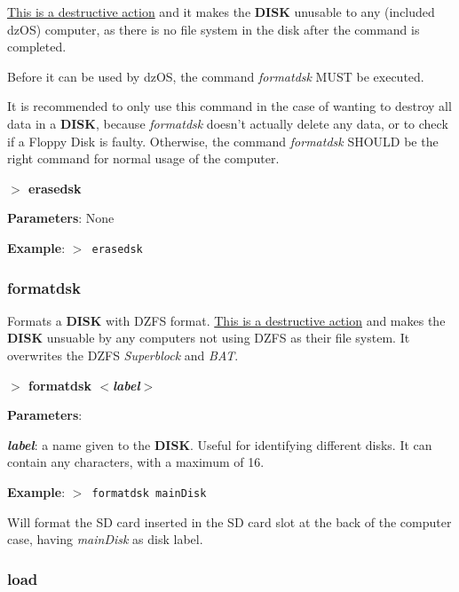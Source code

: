         \underline{This is a destructive action} and it makes the \textbf{DISK}
        unusable to any (included dzOS) computer, as there is no file system in
        the disk after the command is completed.
        
        Before it can be used by dzOS, the command \textit{formatdsk} MUST be
        executed.

        It is recommended to only use this command in the case of wanting to
        destroy all data in a \textbf{DISK}, because \textit{formatdsk} doesn't
        actually delete any data, or to check if a Floppy Disk is faulty.
        Otherwise, the command \textit{formatdsk} SHOULD be the right command
        for normal usage of the computer.

        \hspace{1.9cm}\textbf{$>$ erasedsk}

        \textbf{Parameters}: None

        \textbf{Example}: \texttt{$>$ erasedsk}

        \subsubsection{{formatdsk}}
        Formats a \textbf{DISK} with DZFS format. \underline{This is a
        destructive action} and makes the \textbf{DISK} unsuable by any
        computers not using DZFS as their file system. It overwrites the DZFS
        \textit{Superblock} and \textit{BAT}.

        \hspace{1.9cm}\textbf{$>$ formatdsk \textit{$<$label$>$}}

        \textbf{Parameters}:

        \hspace{1cm}\textbf{\textit{label}}: a name given to the \textbf{DISK}.
        Useful for identifying different disks. It can contain any characters,
        with a maximum of 16.

        \textbf{Example}: \texttt{$>$ formatdsk mainDisk}

        Will format the SD card inserted in the SD card slot at the back of the
        computer case, having \textit{mainDisk} as disk label.

        \subsubsection{{load}}
        \label{cmd:load}

